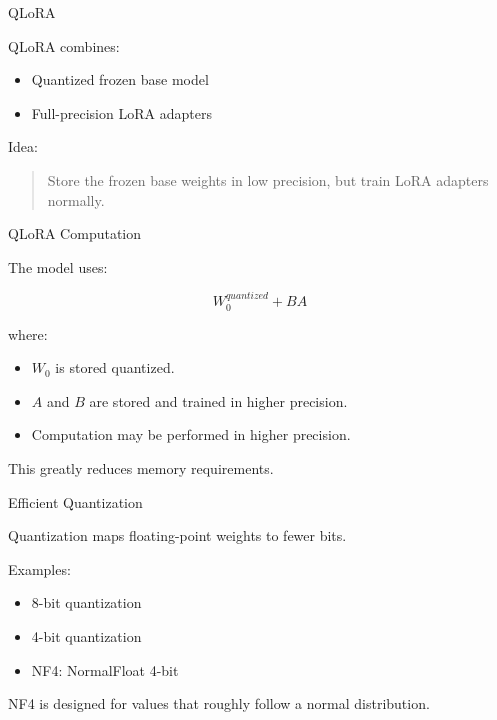 \documentclass[aspectratio=169]{beamer}
\begin{document}
\begin{frame}{QLoRA}

QLoRA combines:

\begin{itemize}
    \item Quantized frozen base model
    \item Full-precision LoRA adapters
\end{itemize}

\vspace{0.5cm}

Idea:

\begin{quote}
Store the frozen base weights in low precision, but train LoRA adapters normally.
\end{quote}

\end{frame}

\begin{frame}{QLoRA Computation}

The model uses:

\[
W_0^{quantized}
+
BA
\]

\vspace{0.5cm}

where:

\begin{itemize}
    \item $W_0$ is stored quantized.
    \item $A$ and $B$ are stored and trained in higher precision.
    \item Computation may be performed in higher precision.
\end{itemize}

\vspace{0.5cm}

This greatly reduces memory requirements.

\end{frame}

\begin{frame}{Efficient Quantization}

Quantization maps floating-point weights to fewer bits.

\vspace{0.5cm}

Examples:

\begin{itemize}
    \item 8-bit quantization
    \item 4-bit quantization
    \item NF4: NormalFloat 4-bit
\end{itemize}

\vspace{0.5cm}

NF4 is designed for values that roughly follow a normal distribution.

\end{frame}
\end{document}

